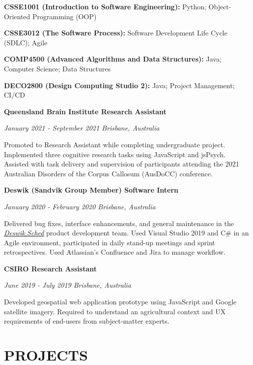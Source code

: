 \documentclass{article}
\begin{document}
  \textbf{CSSE1001 (Introduction to Software Engineering):} Python; Object-Oriented Programming (OOP)

  \textbf{CSSE3012 (The Software Process):} Software Development Life Cycle (SDLC); Agile

  \textbf{COMP4500 (Advanced Algorithms and Data Structures):} Java; Computer Science; Data Structures

  \textbf{DECO2800 (Design Computing Studio 2):} Java; Project Management; CI/CD

  \medbreak

  {\large\textbf{Queensland Brain Institute \hfill Research Assistant}}

  \textit{January 2021 - September 2021 \hfill Brisbane, Australia}

  Promoted to Research Assistant while completing undergraduate project. Implemented three cognitive research tasks using JavaScript and jsPsych. Assisted with task delivery and supervision of participants attending the 2021 Australian Disorders of the Corpus Callosum (AusDoCC) conference.

  \pagebreak

  {\large\textbf{Deswik (Sandvik Group Member) \hfill Software Intern}}

  \textit{January 2020 - February 2020 \hfill Brisbane, Australia}

  Delivered bug fixes, interface enhancements, and general maintenance in the \href{https://www.deswik.com/product-detail/deswik-scheduler/}{\color{blue}\underline{\textit{Deswik.Sched}}} product development team. Used Visual Studio 2019 and C\# in an Agile environment, participated in daily stand-up meetings and sprint retrospectives. Used Atlassian's Confluence and Jira to manage workflow.

  \medbreak

  {\large\textbf{CSIRO \hfill Research Assistant}}

  \textit{June 2019 - July 2019 \hfill Brisbane, Australia}

  Developed geospatial web application prototype using JavaScript and Google satellite imagery. Required to understand an agricultural context and UX requirements of end-users from subject-matter experts.

  \section*{\centering\uppercase{Projects}}
\end{document}
